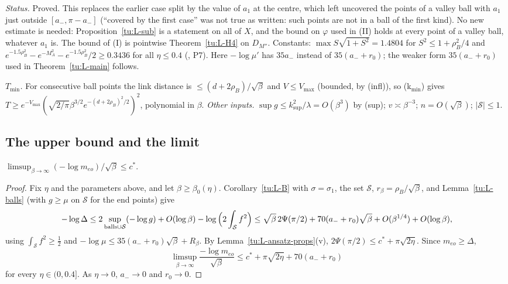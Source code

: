 \noindent\emph{Status.} Proved. This replaces the earlier case split by the value of $a_1$ at the centre, which left uncovered
the points of a valley ball with $a_1$ just outside $[a_-,\pi-a_-]$ (``covered by the first case'' was not true as written: such
points are not in a ball of the first kind). No new estimate is needed: Proposition~\ref{tu:L-sub} is a statement on all of $X$,
and the bound on $\varphi$ used in (II) holds at every point of a valley ball, whatever $a_1$ is. The bound of (I) is pointwise
Theorem~\ref{tu:L-H4} on $D_{M''}$. Constants: $\max S\sqrt{1+S^2}=1.4804$ for $S^2\le1+\rho_B^2/4$ and
$e^{-1.5\rho_B^2}-e^{-M_A^2}-e^{-1.5\rho_B^2}/2\ge0.3436$ for all $\eta\le0.4$ (, P7). Here $-\log\mu'$ has
$35a_-$ instead of $35(a_-+r_0)$; the weaker form $35(a_-+r_0)$ used in Theorem~\ref{tu:L-main} follows.

\noindent\emph{$T_{\min}$.} For consecutive ball points the link distance is $\le(d+2\rho_B)/\sqrt\beta$ and $V\le V_{\max}$ (bounded,
by (infl)), so (k$_{\min}$) gives $T\ge e^{-V_{\max}}(\sqrt{2/\pi}\beta^{3/2}e^{-(d+2\rho_B)^2/2})^2$, polynomial in $\beta$.
\emph{Other inputs.} $\sup g\le k_{\sup}^2/\lambda=O(\beta^3)$ by (sup); $v\asymp\beta^{-3}$; $n=O(\sqrt\beta)$; $|\mathcal S|\le1$.

\subsection{The upper bound and the limit}

\begin{theorem}\label{tu:L-main}
$\limsup_{\beta\to\infty}(-\log m_{eo})/\sqrt\beta\le c^*$.
\end{theorem}

\begin{proof}
Fix $\eta$ and the parameters above, and let $\beta\ge\beta_0(\eta)$. Corollary~\ref{tu:L-B} with $\sigma=\sigma_1$, the set $\mathcal S$,
$r_\beta=\rho_B/\sqrt\beta$, and Lemma~\ref{tu:L-balls} (with $g\ge\mu$ on $\mathcal S$ for the end points) give
\[
-\log\Delta\le2\sup_{\rm balls\cup\mathcal S}(-\log g)+O(\log\beta)-\log\Big(2\int_{\mathcal S}f^2\Big)
\le\sqrt\beta\,2\Psi(\pi/2)+70(a_-+r_0)\sqrt\beta+O(\beta^{1/4})+O(\log\beta),
\]
using $\int_{\mathcal S}f^2\ge\frac12$ and $-\log\mu\le35(a_-+r_0)\sqrt\beta+R_\beta$. By Lemma~\ref{tu:L-ansatz-props}(v),
$2\Psi(\pi/2)\le c^*+\pi\sqrt{2\eta}$. Since $m_{eo}\ge\Delta$,
\[
\limsup_{\beta\to\infty}\frac{-\log m_{eo}}{\sqrt\beta}\le c^*+\pi\sqrt{2\eta}+70(a_-+r_0)
\]
for every $\eta\in(0,0.4]$. As $\eta\to0$, $a_-\to0$ and $r_0\to0$.
\end{proof}

